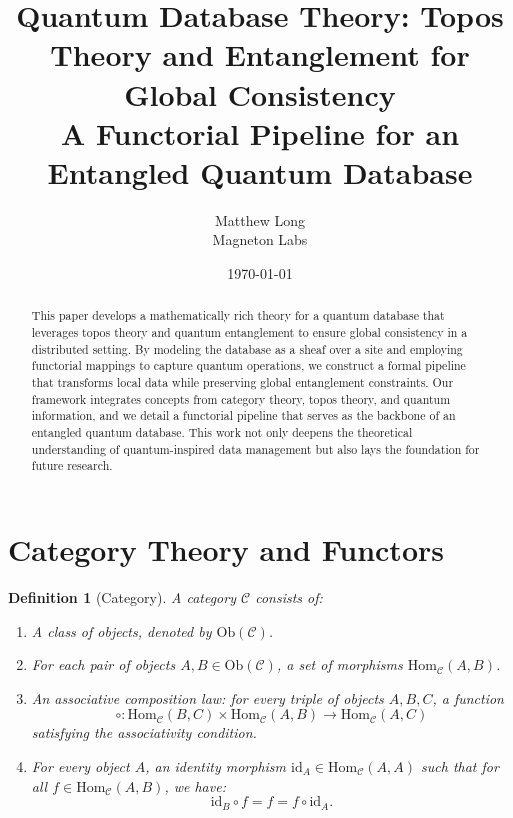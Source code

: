 \documentclass[11pt]{article}
\title{\textbf{Quantum Database Theory: Topos Theory and Entanglement for Global Consistency}\\[1ex]
\large A Functorial Pipeline for an Entangled Quantum Database}
\author{Matthew Long \\ Magneton Labs}
\date{\today}
\newtheorem{definition}{Definition}[section]
\theoremstyle{remark}
\begin{document}
\maketitle

\begin{abstract}
This paper develops a mathematically rich theory for a quantum database that leverages topos theory and quantum entanglement to ensure global consistency in a distributed setting. By modeling the database as a sheaf over a site and employing functorial mappings to capture quantum operations, we construct a formal pipeline that transforms local data while preserving global entanglement constraints. Our framework integrates concepts from category theory, topos theory, and quantum information, and we detail a functorial pipeline that serves as the backbone of an entangled quantum database. This work not only deepens the theoretical understanding of quantum-inspired data management but also lays the foundation for future research.
\end{abstract}

\tableofcontents

\newpage

\section{Category Theory and Functors}

\begin{definition}[Category]
A \emph{category} $\mathcal{C}$ consists of:
\begin{enumerate}[label=(\roman*)]
    \item A class of objects, denoted by $\mathrm{Ob}(\mathcal{C})$.
    \item For each pair of objects $A, B \in \mathrm{Ob}(\mathcal{C})$, a set of morphisms $\mathrm{Hom}_{\mathcal{C}}(A,B)$.
    \item An associative composition law: for every triple of objects $A, B, C$, a function
    \[
    \circ: \mathrm{Hom}_{\mathcal{C}}(B,C) \times \mathrm{Hom}_{\mathcal{C}}(A,B) \to \mathrm{Hom}_{\mathcal{C}}(A,C)
    \]
    satisfying the associativity condition.
    \item For every object $A$, an identity morphism $\mathrm{id}_A \in \mathrm{Hom}_{\mathcal{C}}(A,A)$ such that for all $f \in \mathrm{Hom}_{\mathcal{C}}(A,B)$, we have:
    \[
    \mathrm{id}_B \circ f = f = f \circ \mathrm{id}_A.
    \]
\end{enumerate}
\end{definition}
\end{document}
